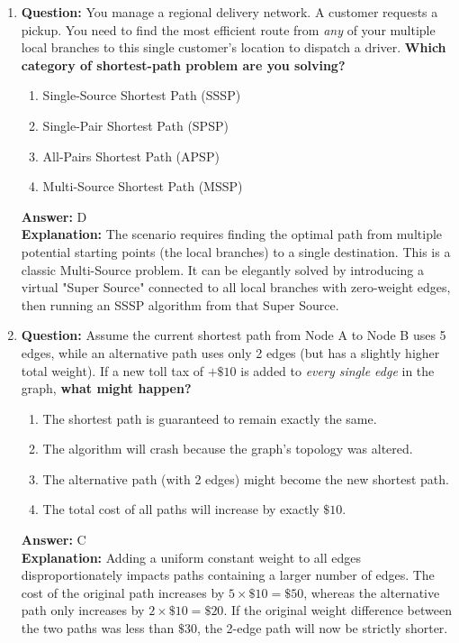 \begin{enumerate}[label=\arabic*., itemsep=1.5em]
    \item \textbf{Question:} You manage a regional delivery network. A customer requests a pickup. You need to find the most efficient route from \textit{any} of your multiple local branches to this single customer's location to dispatch a driver. \textbf{Which category of shortest-path problem are you solving?}
    \begin{enumerate}[label=\Alph*.]
        \item Single-Source Shortest Path (SSSP)
        \item Single-Pair Shortest Path (SPSP)
        \item All-Pairs Shortest Path (APSP)
        \item Multi-Source Shortest Path (MSSP)
    \end{enumerate}
    \textbf{Answer:} D \\
    \textbf{Explanation:} The scenario requires finding the optimal path from multiple potential starting points (the local branches) to a single destination. This is a classic Multi-Source problem. It can be elegantly solved by introducing a virtual "Super Source" connected to all local branches with zero-weight edges, then running an SSSP algorithm from that Super Source.

    \item \textbf{Question:} Assume the current shortest path from Node A to Node B uses 5 edges, while an alternative path uses only 2 edges (but has a slightly higher total weight). If a new toll tax of $+\$10$ is added to \textit{every single edge} in the graph, \textbf{what might happen?}
    \begin{enumerate}[label=\Alph*.]
        \item The shortest path is guaranteed to remain exactly the same.
        \item The algorithm will crash because the graph's topology was altered.
        \item The alternative path (with 2 edges) might become the new shortest path.
        \item The total cost of all paths will increase by exactly $\$10$.
    \end{enumerate}
    \textbf{Answer:} C \\
    \textbf{Explanation:} Adding a uniform constant weight to all edges disproportionately impacts paths containing a larger number of edges. The cost of the original path increases by $5 \times \$10 = \$50$, whereas the alternative path only increases by $2 \times \$10 = \$20$. If the original weight difference between the two paths was less than $\$30$, the 2-edge path will now be strictly shorter.

\end{enumerate}
